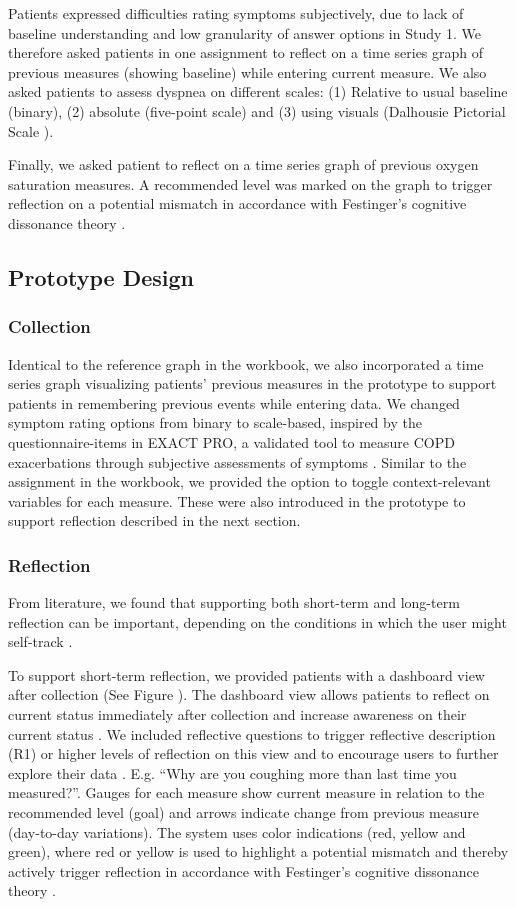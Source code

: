 Patients expressed difficulties rating symptoms subjectively, due to lack of baseline understanding and low granularity of answer options in Study 1. We therefore asked patients in one assignment to reflect on a time series graph of previous measures (showing baseline) while entering current measure. We also asked patients to assess dyspnea on different scales: (1) Relative to usual baseline (binary), (2) absolute (five-point scale) and (3) using visuals (Dalhousie Pictorial Scale \cite{dalhousie}).  

Finally, we asked patient to reflect on a time series graph of previous oxygen saturation measures. A recommended level was marked on the graph to trigger reflection on a potential mismatch in accordance with Festinger’s cognitive dissonance theory \cite{Rivera}. 

\subsection{Prototype Design}

\subsubsection{Collection}
Identical to the reference graph in the workbook, we also incorporated a time series graph visualizing patients’ previous measures in the prototype to support patients in remembering previous events while entering data. We changed symptom rating options from binary to scale-based, inspired by the questionnaire-items in EXACT PRO, a validated tool to measure COPD exacerbations through subjective assessments of symptoms \cite{exact}. Similar to the assignment in the workbook, we provided the option to toggle context-relevant variables for each measure. These were also introduced in the prototype to support reflection described in the next section. 

\subsubsection{Reflection}
From literature, we found that supporting both short-term and long-term reflection can be important, depending on the conditions in which the user might self-track \cite{Li2010, Muller}. 

To support short-term reflection, we provided patients with a dashboard view after collection (See Figure ). The dashboard view allows patients to reflect on current status immediately after collection and increase awareness on their current status \cite{Cutone, Muller}. We included reflective questions to trigger reflective description (R1) or higher levels of reflection on this view and to encourage users to further explore their data \cite{Fleck, Muller}. E.g. “Why are you coughing more than last time you measured?”. Gauges for each measure show current measure in relation to the recommended level (goal) and arrows indicate change from previous measure (day-to-day variations). The system uses color indications (red, yellow and green), where red or yellow is used to highlight a potential mismatch and thereby actively trigger reflection in accordance with Festinger’s cognitive dissonance theory \cite{Rivera}.  

